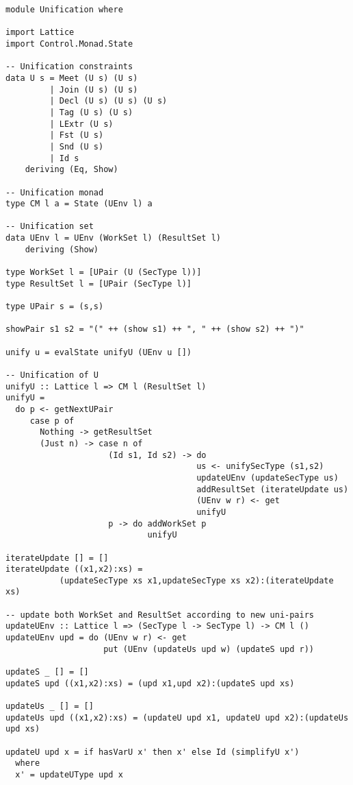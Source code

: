 \begin{Verbatim}[fontsize=\footnotesize,frame=lines,
                 framesep=5mm, label={[Unification.hs]Unification.hs}]
module Unification where

import Lattice
import Control.Monad.State

-- Unification constraints
data U s = Meet (U s) (U s)
         | Join (U s) (U s)
         | Decl (U s) (U s) (U s)
         | Tag (U s) (U s)
         | LExtr (U s) 
         | Fst (U s)
         | Snd (U s)
         | Id s
    deriving (Eq, Show)

-- Unification monad
type CM l a = State (UEnv l) a

-- Unification set
data UEnv l = UEnv (WorkSet l) (ResultSet l)
    deriving (Show)

type WorkSet l = [UPair (U (SecType l))]
type ResultSet l = [UPair (SecType l)]

type UPair s = (s,s)

showPair s1 s2 = "(" ++ (show s1) ++ ", " ++ (show s2) ++ ")"

unify u = evalState unifyU (UEnv u [])

-- Unification of U 
unifyU :: Lattice l => CM l (ResultSet l)
unifyU =
  do p <- getNextUPair
     case p of
       Nothing -> getResultSet
       (Just n) -> case n of
                     (Id s1, Id s2) -> do
                                       us <- unifySecType (s1,s2)
                                       updateUEnv (updateSecType us)
                                       addResultSet (iterateUpdate us)
                                       (UEnv w r) <- get
                                       unifyU
                     p -> do addWorkSet p
                             unifyU

iterateUpdate [] = []
iterateUpdate ((x1,x2):xs) = 
           (updateSecType xs x1,updateSecType xs x2):(iterateUpdate xs)

-- update both WorkSet and ResultSet according to new uni-pairs
updateUEnv :: Lattice l => (SecType l -> SecType l) -> CM l ()
updateUEnv upd = do (UEnv w r) <- get
                    put (UEnv (updateUs upd w) (updateS upd r))

updateS _ [] = []
updateS upd ((x1,x2):xs) = (upd x1,upd x2):(updateS upd xs)

updateUs _ [] = []
updateUs upd ((x1,x2):xs) = (updateU upd x1, updateU upd x2):(updateUs upd xs)

updateU upd x = if hasVarU x' then x' else Id (simplifyU x')
  where
  x' = updateUType upd x


\end{Verbatim}
